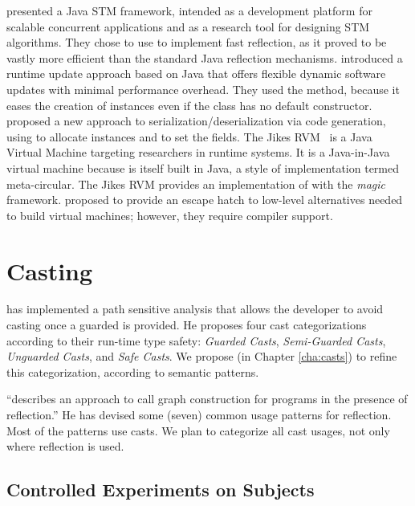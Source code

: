 \cite{korlandNoninvasiveConcurrencyJava2010} presented a Java STM framework, intended as a development platform for scalable concurrent applications and as a research tool for designing STM algorithms.
They chose to use \smu{} to implement fast reflection, as it proved to be vastly more efficient than the standard Java reflection mechanisms.
\cite{pukallFlexibleDynamicSoftware} introduced a runtime update approach based on Java that offers flexible dynamic software updates with minimal performance overhead.
They used the  method, because it eases the creation of instances even if the class has no default constructor.
\cite{gligoricCoDeSeFastDeserialization2011} proposed a new approach to serialization/deserialization via code generation, using \smu{} to allocate instances and to set the fields.
The Jikes RVM~\cite{alpernJikesResearchVirtual2005} is a Java Virtual Machine targeting researchers in runtime systems.
It is a Java-in-Java virtual machine because is itself built in Java, a style of implementation termed meta-circular.
The Jikes RVM provides an implementation of \smu{} with the \emph{magic} framework.
\cite{framptonDemystifyingMagicHighlevel2009} proposed  to provide an escape hatch to low-level alternatives needed to build virtual machines; however, they require compiler support.

\section{Casting}
\label{sec:lr:casting}

\cite{wintherGuardedTypePromotion2011} has implemented a path sensitive analysis that allows the developer to avoid casting once a guarded  is provided.
He proposes four cast categorizations according to their run-time type safety: \emph{Guarded Casts}, \emph{Semi-Guarded Casts}, \emph{Unguarded Casts}, and \emph{Safe Casts}.
We propose (in Chapter \ref{cha:casts}) to refine this categorization, according to semantic patterns.

\cite{livshitsImprovingSoftwareSecurity2006,livshitsReflectionAnalysisJava2005} ``describes an approach to call graph construction for \java{} programs in the presence of reflection.''
He has devised some (seven) common usage patterns for reflection.
Most of the patterns use casts.
We plan to categorize all cast usages, not only where reflection is used.

\subsection*{Controlled Experiments on Subjects}
\label{sec:lr:experiments}

